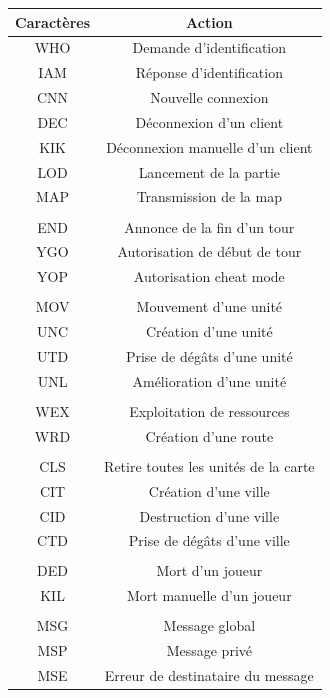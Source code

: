 \documentclass[12pt]{report}
\begin{document}
\begin{center}
	\begin{tabular}{c|c}
		\toprule
		\textbf{Caractères}  & \textbf{Action}\\ 
		\midrule
		WHO & Demande d’identification \\
		IAM & Réponse d'identification \\
		CNN & Nouvelle connexion \\
		DEC & Déconnexion d’un client \\
        KIK & Déconnexion manuelle d’un client \\
        LOD & Lancement de la partie \\
		MAP & Transmission de la map \\
        \\
		END & Annonce de la fin d’un tour \\
		YGO & Autorisation de début de tour\\
        YOP & Autorisation cheat mode\\
        \\
		MOV & Mouvement d’une unité\\
        UNC & Création d'une unité\\
        UTD & Prise de dégâts d'une unité\\
        UNL & Amélioration d'une unité\\
        \\
        WEX & Exploitation de ressources\\
        WRD & Création d'une route\\
        \\
        CLS & Retire toutes les unités de la carte\\
        CIT & Création d'une ville\\
        CID & Destruction d'une ville\\
        CTD & Prise de dégâts d'une ville\\
        \\
        DED & Mort d'un joueur\\
        KIL & Mort manuelle d'un joueur\\
        \\
		MSG & Message global\\
		MSP & Message privé\\
		MSE & Erreur de destinataire du message\\
		\bottomrule
	\end{tabular}
\end{center}
\end{document}
